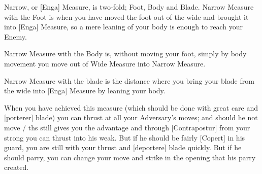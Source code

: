 Narrow, or [Enga] Measure, is
two-fold; Foot, Body and Blade. Narrow Measure with the Foot is when
you have moved the foot out of the wide and brought it into [Enga]
Measure, so a mere leaning of your body is enough to reach your Enemy.

Narrow Measure with the Body is, without moving your foot, simply by
body movement you move out of Wide Measure into Narrow Measure.

Narrow Measure with the blade is the distance where you bring your
blade from the wide into [Enga] Measure by leaning your body.


When you have achieved this measure (which should be done with great
care and [porterer] blade) you can thrust at all your Adversary's
moves; and should he not move / ths still gives you the advantage and
through [Contrapostur] from your strong you can thrust into his
weak. But if he should be fairly [Copert] in his guard, you are still
with your thrust and [deportere] blade quickly. But if he should
parry, you can change your move and strike in the opening that his
parry created.


